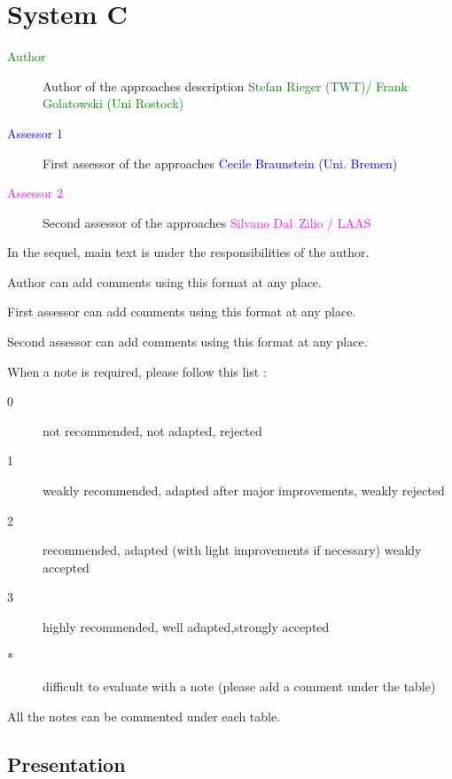 
\chapter{System C}

\begin{description}
\item[\textcolor{green}{Author}] Author of the approaches description \textcolor{green}{Stefan Rieger (TWT)/ Frank Golatowski (Uni Rostock)}
\item[\textcolor{blue}{Assessor 1}] First assessor of the approaches \textcolor{blue}{Cecile Braunstein (Uni. Bremen)}
\item[\textcolor{magenta}{Assessor 2}] Second assessor of the approaches \textcolor{magenta}{Silvano Dal~Zilio / LAAS}
\end{description}

In the sequel, main text is under the responsibilities of the author.

\begin{author_comment}
Author can add comments using this format at any place.
\end{author_comment}

\begin{assessor1}
First assessor can add comments using this format at any place.
\end{assessor1}

\begin{assessor2}
Second assessor can add comments using this format at any place.
\end{assessor2}

When a note is required, please follow this list :
\begin{description}
\item[0] not recommended, not adapted, rejected
\item[1] weakly recommended, adapted after major improvements, weakly rejected
\item[2] recommended, adapted (with light improvements if necessary) weakly accepted
\item[3] highly recommended, well adapted,strongly accepted
\item[*] difficult to evaluate with a note (please add a comment under the table)
\end{description}

All the notes can be commented under each table.

\section{Presentation}

